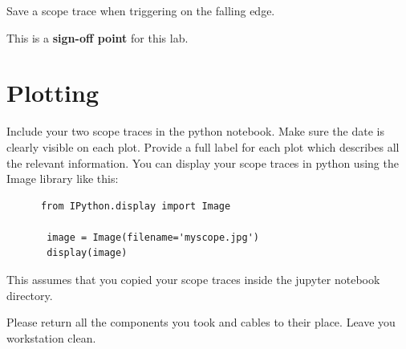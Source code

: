 \begin{plot} Save a scope trace when triggering on the falling edge.
\end{plot}

\noindent
This is a \textbf{sign-off point} for this lab. 

\section{Plotting}

Include your two scope traces in the python notebook. Make sure the date is clearly visible on each plot. Provide a full label for each plot which describes all the relevant information. 
You can display your scope traces in python using the Image library like this:
\begin{verbatim}
      from IPython.display import Image

       image = Image(filename='myscope.jpg') 
       display(image)
\end{verbatim}
This assumes that you copied your scope traces inside the jupyter notebook directory. 


\noindent
Please return all the components you took and cables to their place. Leave you workstation clean. 